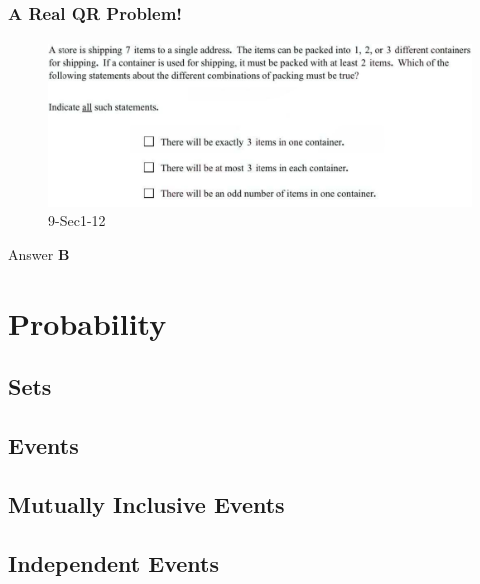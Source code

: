 \documentclass[
	11pt, %
	handout,
]{beamer}
\begin{document}

\begin{frame}
	\frametitle{A Real QR Problem!}
	\framesubtitle{}
	\begin{figure}
		\includegraphics[width=\linewidth]{Combinations_Example_Question.png}
		\caption{9-Sec1-12}
	\end{figure}
	\pause
\pause
\bigskip
Answer \textbf{B } 
\end{frame}

\section{Probability}


\subsection{Sets}


\subsection{Events}


\subsection{Mutually Inclusive Events}


\subsection{Independent Events}
\end{document}
